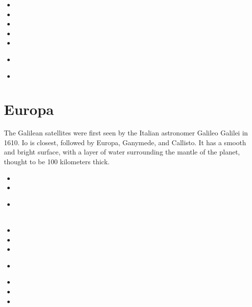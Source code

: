 \begin{small}
\begin{itemize}
\item[\twothousandone] 
\item[\twothousandtwelve] 
\item[\twothousandseventeen] 
\item[\twothousandnineteen] 
\item[\twothousandtwenty] 
\item[\twothousandtwentyone]
 \\ 
\item[\twothousandtwentythree]
\end{itemize}
\end{small}

\section{Europa}

The Galilean satellites were first seen by the Italian astronomer 
Galileo Galilei in 1610. Io is closest, followed by Europa, Ganymede, 
and Callisto. It has a smooth and bright surface, with a layer of 
water surrounding the mantle of the planet, thought to be 100 kilometers thick.

\begin{small}
\begin{itemize}
\item[\twothousandtwo] 
\item[\twothousandfour] 
\item[\twothousandfive] 
\\ 
\\ 
\item[\twothousandeight] 
\item[\twothousandten] 
\item[\twothousandeleven] 
\item[\twothousandfourteen] 
 \\
\item[\twothousandnineteen] 
\item[\twothousandtwentyone] 
\item[\twothousandtwentytwo] 
\end{itemize}
\end{small}



